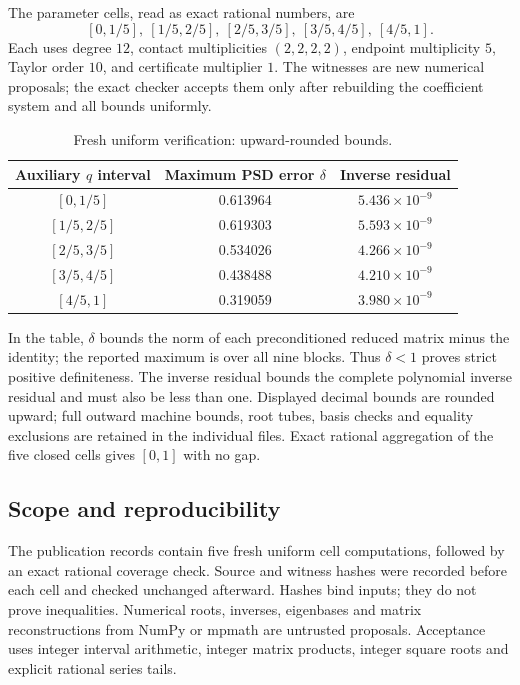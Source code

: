 \documentclass[11pt,reqno]{amsart}
\theoremstyle{remark}\newtheorem{remark}[theorem]{Remark}
\numberwithin{equation}{section}
\begin{document}
The parameter cells, read as exact rational numbers, are
\[
 [0,1/5],\ [1/5,2/5],\ [2/5,3/5],\ [3/5,4/5],\ [4/5,1].
\]
Each uses degree $12$, contact multiplicities $(2,2,2,2)$, endpoint
multiplicity $5$, Taylor order $10$, and certificate multiplier $1$.
The witnesses are new numerical proposals; the exact checker accepts them
only after rebuilding the coefficient system and all bounds uniformly.
\begin{table}[htbp]
\centering
\caption{Fresh uniform verification: upward-rounded bounds.}
\begin{tabular}{@{}ccc@{}}
\toprule
Auxiliary $q$ interval & Maximum PSD error $\delta$ & Inverse residual \\
\midrule
$[0,1/5]$ & 0.613964 & $5.436\times10^{-9}$ \\
$[1/5,2/5]$ & 0.619303 & $5.593\times10^{-9}$ \\
$[2/5,3/5]$ & 0.534026 & $4.266\times10^{-9}$ \\
$[3/5,4/5]$ & 0.438488 & $4.210\times10^{-9}$ \\
$[4/5,1]$ & 0.319059 & $3.980\times10^{-9}$ \\
\bottomrule
\end{tabular}
\end{table}

In the table, $\delta$ bounds the norm of each preconditioned reduced
matrix minus the identity; the reported maximum is over all nine blocks.
Thus $\delta<1$ proves strict positive definiteness. The inverse residual
bounds the complete polynomial inverse residual and must also be less
than one. Displayed decimal bounds are rounded upward; full outward
machine bounds, root tubes, basis checks and equality exclusions are
retained in the individual  files. Exact rational
aggregation of the five closed cells gives $[0,1]$ with no gap.

\subsection{Scope and reproducibility}
The publication records contain five fresh uniform cell computations,
followed by an exact rational coverage check. Source and witness hashes
were recorded before each cell and checked unchanged afterward. Hashes
bind inputs; they do not prove inequalities. Numerical roots, inverses,
eigenbases and matrix reconstructions from NumPy or mpmath are untrusted
proposals. Acceptance uses integer interval arithmetic, integer matrix
products, integer square roots and explicit rational series tails.
\end{document}
